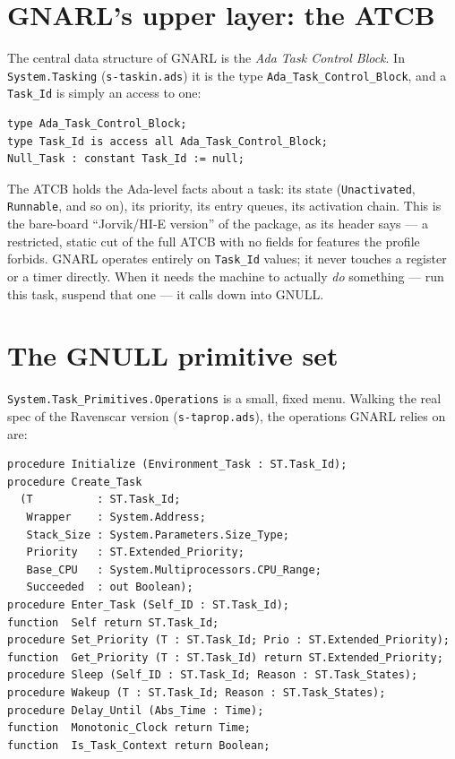 \section{GNARL's upper layer: the ATCB}

The central data structure of GNARL is the \emph{Ada Task Control Block}. In
\texttt{System.Tasking} (\texttt{s-taskin.ads}) it is the type
\texttt{Ada\_Task\_Control\_Block}, and a \texttt{Task\_Id} is simply an access
to one:

\begin{lstlisting}
type Ada_Task_Control_Block;
type Task_Id is access all Ada_Task_Control_Block;
Null_Task : constant Task_Id := null;
\end{lstlisting}

The ATCB holds the Ada-level facts about a task: its state
(\texttt{Unactivated}, \texttt{Runnable}, and so on), its priority, its entry
queues, its activation chain. This is the bare-board ``Jorvik/HI-E version'' of
the package, as its header says --- a restricted, static cut of the full ATCB
with no fields for features the profile forbids. GNARL operates entirely on
\texttt{Task\_Id} values; it never touches a register or a timer directly.
When it needs the machine to actually \emph{do} something --- run this task,
suspend that one --- it calls down into GNULL.

\section{The GNULL primitive set}

\texttt{System.Task\_Primitives.Operations} is a small, fixed menu. Walking the
real spec of the Ravenscar version (\texttt{s-taprop.ads}), the operations GNARL
relies on are:

\begin{lstlisting}
procedure Initialize (Environment_Task : ST.Task_Id);
procedure Create_Task
  (T          : ST.Task_Id;
   Wrapper    : System.Address;
   Stack_Size : System.Parameters.Size_Type;
   Priority   : ST.Extended_Priority;
   Base_CPU   : System.Multiprocessors.CPU_Range;
   Succeeded  : out Boolean);
procedure Enter_Task (Self_ID : ST.Task_Id);
function  Self return ST.Task_Id;
procedure Set_Priority (T : ST.Task_Id; Prio : ST.Extended_Priority);
function  Get_Priority (T : ST.Task_Id) return ST.Extended_Priority;
procedure Sleep (Self_ID : ST.Task_Id; Reason : ST.Task_States);
procedure Wakeup (T : ST.Task_Id; Reason : ST.Task_States);
procedure Delay_Until (Abs_Time : Time);
function  Monotonic_Clock return Time;
function  Is_Task_Context return Boolean;
\end{lstlisting}

